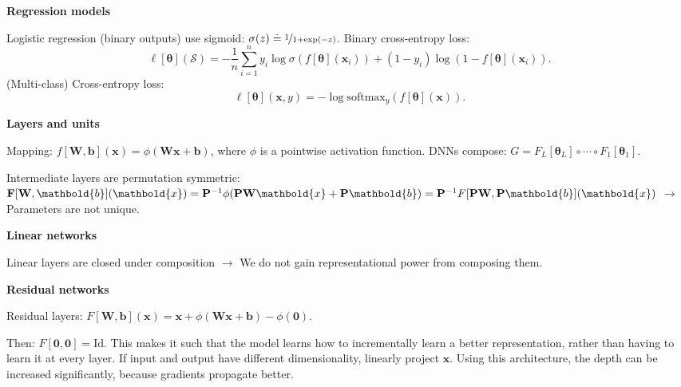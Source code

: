 \documentclass[10pt]{article}
\newenvironment{topic}[1]
{\textbf{\sffamily \footnotesize \colorbox{black}{\rlap{\textbf{\textcolor{white}{#1}}}\hspace{\linewidth}\hspace{-2\fboxsep}}}}
{}
\newenvironment{subtopic}[1]
{\begin{center}\textbf{\footnotesize \sffamily #1}\end{center}}
{}
\renewcommand{\mat}[1]{\ensuremath{\mathbf{#1}}}
\renewcommand{\vec}[1]{\ensuremath{\mathbold{#1}}}
\begin{document}
\begin{multicols*}{3}
\begin{topic}{Feedforward networks}
\begin{subtopic}{Regression models}
            Logistic regression (binary outputs) use sigmoid: $\sigma(z) \doteq \nicefrac{1}{1 + \exp(-z)}$.
            Binary cross-entropy loss: \[
                \ell[\vec{\theta}](\mathcal{S}) = -\frac{1}{n} \sum_{i=1}^{n} y_i \log \sigma(f[\vec{\theta}](\vec{x}_i)) + (1-y_i)\log(1-f[\vec{\theta}](\vec{x}_i)).
            \] (Multi-class) Cross-entropy loss: \[
                \ell[\vec{\theta}](\vec{x},y) = -\log \mathrm{softmax}_y(f[\vec{\theta}](\vec{x})).
            \]
        \end{subtopic}

        \begin{subtopic}{Layers and units}
            Mapping: $f[\mat{W},\vec{b}](\vec{x}) = \phi(\mat{W}\vec{x}+\vec{b})$, where $\phi$ is a pointwise activation function. DNNs compose: $G = F_L[\vec{\theta}_L] \circ \cdots \circ F_1[\vec{\theta}_1]$.

            Intermediate layers are permutation symmetric: $\mat{F}[\mat{W},\vec{b}](\vec{x}) = \inv{\mat{P}}
                \phi(\mat{P}\mat{W}\vec{x} + \mat{P}\vec{b}) = \inv{\mat{P}} F[\mat{P} \mat{W},
                        \mat{P}\vec{b}](\vec{x})$ $\to$ Parameters are not unique.
        \end{subtopic}

        \begin{subtopic}{Linear networks}
            Linear layers are closed under composition $\to$ We do not gain representational power from composing them.
        \end{subtopic}

        \begin{subtopic}{Residual networks}
            Residual layers: $F[\mat{W},\vec{b}](\vec{x}) = \vec{x} + \phi(\mat{W}\vec{x} + \vec{b}) - \phi(\vec{0})$.

            Then: $F[\vec{0}, \vec{0}] = \mathrm{Id}$. This makes it such that the model learns how to
            incrementally learn a better representation, rather than having to learn it at every layer. If
            input and output have different dimensionality, linearly project $\vec{x}$. Using this
            architecture, the depth can be increased significantly, because gradients propagate better.
        \end{subtopic}


\end{topic}
\end{multicols*}
\end{document}
